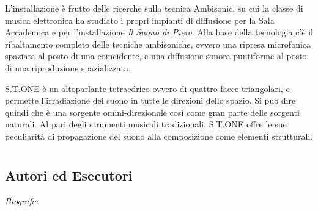 \documentclass[9pt, twoside, a5paper]{extreport}
\begin{document}
\begin{multicols}{2}

\noindent L'installazione è frutto delle ricerche sulla tecnica Ambisonic, su cui la classe di musica elettronica ha studiato i propri impianti di diffusione per la Sala Accademica e per l'installazione \textit{Il Suono di Piero}. Alla base della tecnologia c'è il ribaltamento completo delle tecniche ambisoniche, ovvero una ripresa microfonica spaziata al posto di una coincidente, e una diffusione sonora puntiforme al posto di una riproduzione spazializzata.

S.T.ONE è un altoparlante tetraedrico ovvero di quattro facce triangolari, e permette l'irradiazione del suono in tutte le direzioni dello spazio. Si può dire quindi che è una sorgente omini-direzionale così come gran parte delle sorgenti naturali. Al pari degli strumenti musicali tradizionali, S.T.ONE offre le sue peculiarità di propagazione del suono alla composizione come elementi strutturali.
\end{multicols}

%	
%
%	
%	
%
	\clearpage
%


\section*{ }

\subsection*{\textsf{Autori ed Esecutori}\\}
	
{\fontsize{30}{30}\selectfont \textit{Biografie}}

\bigskip
\end{document}
